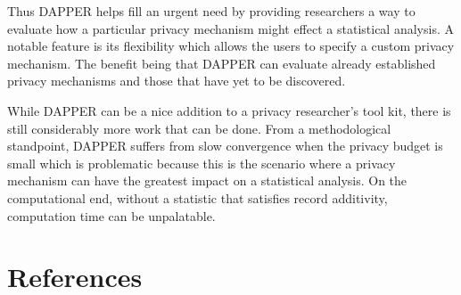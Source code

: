 Thus DAPPER helps fill an urgent need by providing researchers a way to evaluate
how a particular privacy mechanism might effect a statistical analysis. A notable
feature is its flexibility which allows the users to specify a custom
privacy mechanism. The benefit being that DAPPER can evaluate already
established privacy mechanisms and those that have yet to be discovered.

While DAPPER can be a nice addition to a privacy researcher's tool kit, there
is still considerably more work that can be done. From a methodological standpoint,
DAPPER suffers from slow convergence when the privacy budget is small which is problematic
because this is the scenario where a privacy mechanism can have the greatest impact
on a statistical analysis. On the computational end, without a statistic that satisfies
record additivity, computation time can be unpalatable.

\hypertarget{references}{%
\section*{References}\label{references}}

